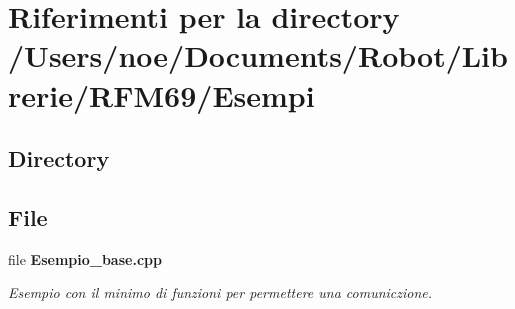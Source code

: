 \section{Riferimenti per la directory /\+Users/noe/\+Documents/\+Robot/\+Librerie/\+R\+F\+M69/\+Esempi}
\label{dir_2392674369b09c96346233c031ed41d8}
\subsection*{Directory}
\begin{DoxyCompactItemize}
\end{DoxyCompactItemize}
\subsection*{File}
\begin{DoxyCompactItemize}
\item 
file \textbf{ Esempio\+\_\+base.\+cpp}
\begin{DoxyCompactList}\small\item\em Esempio con il minimo di funzioni per permettere una comuniczione. \end{DoxyCompactList}\end{DoxyCompactItemize}
